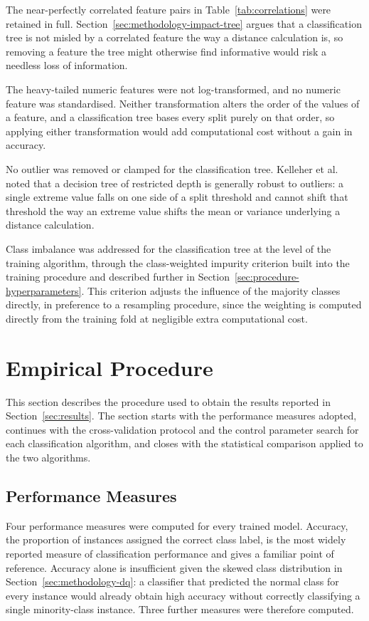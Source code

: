 \documentclass[10pt,conference]{IEEEtran}
\begin{document}
The near-perfectly correlated feature pairs in Table~\ref{tab:correlations} were retained in full. Section~\ref{sec:methodology-impact-tree} argues that a classification tree is not misled by a correlated feature the way a distance calculation is, so removing a feature the tree might otherwise find informative would risk a needless loss of information.

The heavy-tailed numeric features were not log-transformed, and no numeric feature was standardised. Neither transformation alters the order of the values of a feature, and a classification tree bases every split purely on that order, so applying either transformation would add computational cost without a gain in accuracy.

No outlier was removed or clamped for the classification tree. Kelleher et al.~\cite{kelleher2020} noted that a decision tree of restricted depth is generally robust to outliers: a single extreme value falls on one side of a split threshold and cannot shift that threshold the way an extreme value shifts the mean or variance underlying a distance calculation.

Class imbalance was addressed for the classification tree at the level of the training algorithm, through the class-weighted impurity criterion built into the training procedure and described further in Section~\ref{sec:procedure-hyperparameters}. This criterion adjusts the influence of the majority classes directly, in preference to a resampling procedure, since the weighting is computed directly from the training fold at negligible extra computational cost.

\section{Empirical Procedure}
\label{sec:procedure}

This section describes the procedure used to obtain the results reported in Section~\ref{sec:results}. The section starts with the performance measures adopted, continues with the cross-validation protocol and the control parameter search for each classification algorithm, and closes with the statistical comparison applied to the two algorithms.

\subsection{Performance Measures}
\label{sec:procedure-measures}

Four performance measures were computed for every trained model. Accuracy, the proportion of instances assigned the correct class label, is the most widely reported measure of classification performance and gives a familiar point of reference. Accuracy alone is insufficient given the skewed class distribution in Section~\ref{sec:methodology-dq}: a classifier that predicted the normal class for every instance would already obtain high accuracy without correctly classifying a single minority-class instance. Three further measures were therefore computed.
\end{document}

